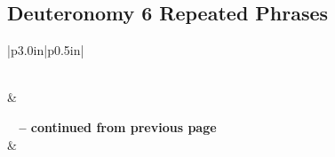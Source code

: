\subsection{Deuteronomy 6 Repeated Phrases}


\normalsize
 
\begin{center}
\begin{longtable}{|p{3.0in}|p{0.5in}|}
\caption[Deuteronomy 6 Repeated Phrases]{Deuteronomy 6 Repeated Phrases}\label{table:Repeated Phrases Deuteronomy 6} \\
\hline {} &  \\ \hline 
\endfirsthead
 
{{\bfseries \tablename\ \thetable{} -- continued from previous page}} \\  
\hline {} &  \\ \hline 
\endhead
 

\end{longtable}
\end{center}
